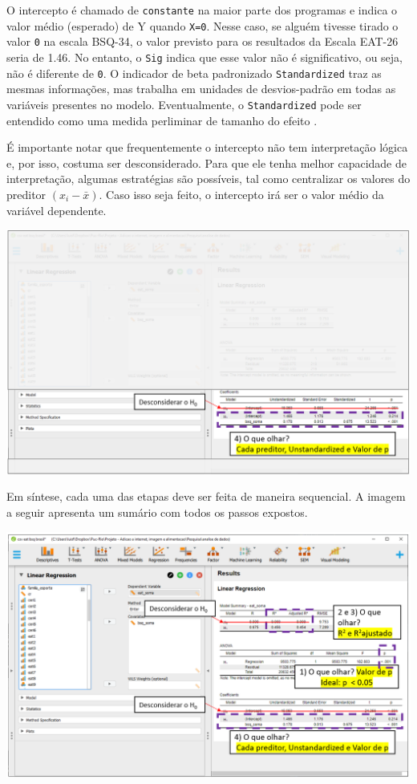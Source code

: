 \documentclass[
]{book}
\begin{document}
O intercepto é chamado de \texttt{constante} na maior parte dos programas e indica o valor médio (esperado) de Y quando \texttt{X=0}. Nesse caso, se alguém tivesse tirado o valor \texttt{0} na escala BSQ-34, o valor previsto para os resultados da Escala EAT-26 seria de 1.46. No entanto, o \texttt{Sig} indica que esse valor não é significativo, ou seja, não é diferente de \texttt{0}. O indicador de beta padronizado \texttt{Standardized} traz as mesmas informações, mas trabalha em unidades de desvios-padrão em todas as variáveis presentes no modelo. Eventualmente, o \texttt{Standardized} pode ser entendido como uma medida perliminar de tamanho do efeito \citep{fox2016}.

É importante notar que frequentemente o intercepto não tem interpretação lógica e, por isso, costuma ser desconsiderado. Para que ele tenha melhor capacidade de interpretação, algumas estratégias são possíveis, tal como centralizar os valores do preditor \((x_i-\bar{x})\). Caso isso seja feito, o intercepto irá ser o valor médio da variável dependente.

\includegraphics{./img/cap_reg_resultados4.png}

Em síntese, cada uma das etapas deve ser feita de maneira sequencial. A imagem a seguir apresenta um sumário com todos os passos expostos.

\includegraphics{./img/cap_reg_resultados_juntos.png}
\end{document}
